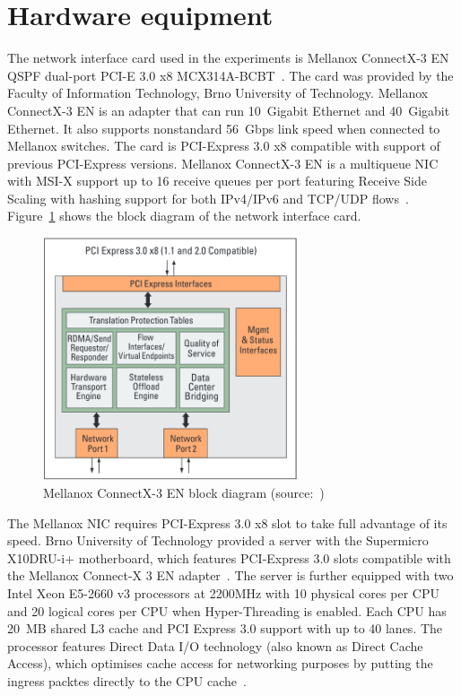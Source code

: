 
\section{Hardware equipment}\label{sec:analysis-hardware}
The network interface card used in the experiments is
Mellanox ConnectX-3 EN QSPF dual-port PCI-E 3.0 x8 MCX314A-BCBT~\cite{mellanox-product-brief}.
The card was provided by the Faculty of Information Technology, Brno University of Technology.
Mellanox ConnectX-3 EN is an adapter that can run 10~Gigabit Ethernet and 40~Gigabit Ethernet.
It also supports nonstandard 56~Gbps link speed when connected to Mellanox switches.
The card is PCI-Express 3.0 x8 compatible with support of previous PCI-Express versions.
Mellanox ConnectX-3 EN is a multiqueue NIC with MSI-X support up to 16 receive queues per port
featuring Receive Side Scaling with hashing support for both IPv4/IPv6 and TCP/UDP flows~\cite{mellanox-silicon, mellanox-user-manual}.
Figure~\ref{fig:setup-mlx-block-diagram} shows the block diagram of the network interface card.

\begin{figure}
	\centering
	\includegraphics[width=7.5cm,keepaspectratio]{fig/mlx-block-diagram.png}
	\caption{Mellanox ConnectX-3 EN block diagram (source:~\cite{mellanox-silicon})}
	\label{fig:setup-mlx-block-diagram}
	\bigskip
\end{figure}

The Mellanox NIC requires PCI-Express 3.0 x8 slot to take full advantage of its speed.
Brno University of Technology provided a server with
the Supermicro X10DRU-i+ motherboard, which
features PCI-Express 3.0 slots compatible with the Mellanox Connect-X 3 EN adapter~\cite{supermicro-board}.
The server is further equipped with two Intel Xeon E5-2660 v3 processors at 2200MHz with 10 physical cores per CPU
and 20 logical cores per CPU when Hyper-Threading is enabled.
Each CPU has 20~MB shared L3 cache and PCI Express 3.0 support with up to 40 lanes.
The processor features Direct Data I/O technology (also known as Direct Cache Access),
which optimises cache access for networking purposes by putting the ingress packtes directly to the CPU cache~\cite{intel-xeon-cpu}.


